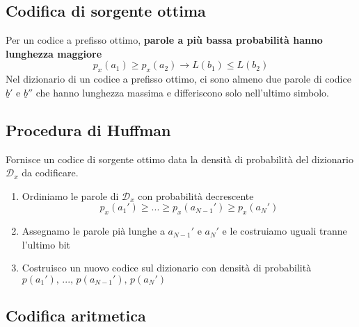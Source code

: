 \documentclass{article}
\begin{document}
\subsection{Codifica di sorgente ottima}
Per un codice a prefisso ottimo, \textbf{parole a più bassa probabilità hanno lunghezza maggiore} $$p_x(a_1)\geq p_x(a_2)\rightarrow L(b_1)\leq L(b_2)$$
Nel dizionario di un codice a prefisso ottimo, ci sono almeno due parole di codice $\underline{b}'$ e $\underline{b}''$ che hanno lunghezza massima e differiscono solo nell'ultimo simbolo.\\

\subsection{Procedura di Huffman}
Fornisce un codice di sorgente ottimo data la densità di probabilità del dizionario $\mathcal{D}_x$ da codificare.
\begin{enumerate}
	\item Ordiniamo le parole di $\mathcal{D}_x$ con probabilità decrescente $$p_x(a_1')\geq...\geq p_x(a_{N-1}')\geq p_x(a_N')$$
	\item Assegnamo le parole pià lunghe a $a_{N-1}'$ e $a_N'$ e le costruiamo uguali tranne l'ultimo bit
	\item Costruisco un nuovo codice sul dizionario con densità di probabilità\\ $p(a_1'),\,...,\,p(a_{N-1}'),\,p(a_N')$
\end{enumerate}

\subsection{Codifica aritmetica}
\end{document}
